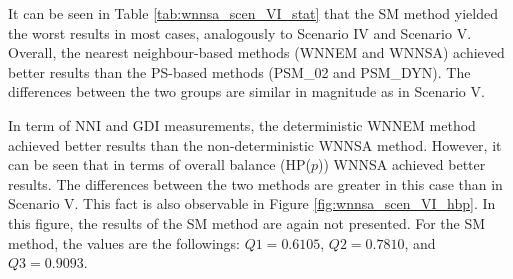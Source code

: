 		\begin{table}[h]
			\caption{Quality measures for Scenario VI. %
			}
			\label{tab:wnnsa_scen_VI_stat}
			\centering
		\end{table}
								
		It can be seen in Table \ref{tab:wnnsa_scen_VI_stat} that the SM method yielded the worst results in most cases, analogously to Scenario IV and Scenario V. Overall, the nearest neighbour-based methods (WNNEM and WNNSA) achieved better results than the PS-based methods (PSM\_02 and PSM\_DYN). The differences between the two groups are similar in magnitude as in Scenario V.
								
		In term of NNI and GDI measurements, the deterministic WNNEM method achieved better results than the non-deterministic WNNSA method. However, it can be seen that in terms of overall balance (HP($p$)) WNNSA achieved better results. The differences between the two methods are greater in this case than in Scenario V. This fact is also observable in Figure \ref{fig:wnnsa_scen_VI_hbp}. In this figure, the results of the SM method are again not presented. For the SM method, the values are the followings: $Q1=0.6105$, $Q2=0.7810$, and $Q3=0.9093$.
								
